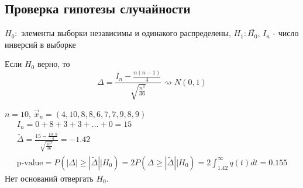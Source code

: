 \documentclass{article}
\begin{document}
\subsection{Проверка гипотезы случайности}
$H_0:$ элементы выборки независимы и одинакого распределены, $H_1:\bar{H_0}$,
$I_n$ - число инверсий в выборке
\begin{theorem}
  Если $H_0$ верно, то
\[
  \Delta=\frac{I_n-\frac{n(n-1)}{4}}{\sqrt{\frac{n^{3}}{36}}} \rightsquigarrow N(0,1)
\]
\end{theorem}
\begin{eg}
  $n=10$, $\vec{x}_n=(4, 10, 8, 8, 6, 7, 7, 9, 8, 9)$
  \begin{gather*}
    I_n=0+8+3+3+\dots + 0 = 15 \\ 
    \tilde{\Delta}=\frac{15-\frac{10\cdot 9}{4}}{\sqrt{\frac{10^3}{36}}}=-1.42 \\ 
    \text{p-value}=P(|\Delta| \ge |\tilde{\Delta}| \big| H_0)=2P(\Delta \ge |\tilde{\Delta}| \big| H_0)
    = 2 \int_{ 1.42}^{\infty}q(t)dt=0.155
  \end{gather*}
  Нет оснований отвергать $H_0$.
\end{eg}
\end{document}
